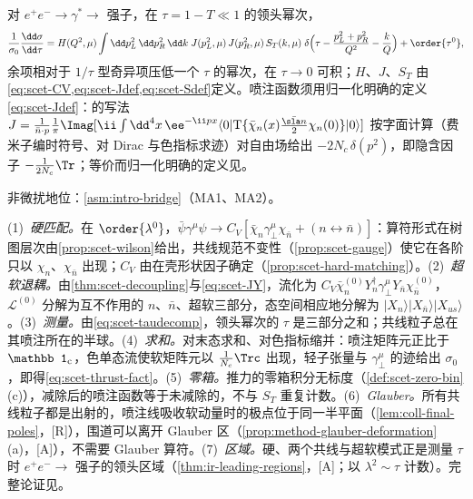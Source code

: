 \begin{theorem}\label{thm:scet-thrust}
对 $e^+e^-\to\gamma^*\to$ 强子，在 $\tau=1-T\ll1$ 的领头幂次，
\begin{equation}\label{eq:scet-thrust-fact}
\frac{1}{\sigma_0}\frac{\dd\sigma}{\dd\tau}=H(Q^2,\mu)\int\dd p_L^2\,\dd p_R^2\,\dd k\;J(p_L^2,\mu)\,J(p_R^2,\mu)\,S_T(k,\mu)\;
\delta\Big(\tau-\frac{p_L^2+p_R^2}{Q^2}-\frac kQ\Big)+\order{\tau^0},
\end{equation}
余项相对于 $1/\tau$ 型奇异项压低一个 $\tau$ 的幂次，在 $\tau\to0$ 可积；$H$、$J$、$S_T$ 由\cref{eq:scet-CV,eq:scet-Jdef,eq:scet-Sdef}定义。喷注函数须用归一化明确的定义\cref{eq:scet-Jdef}：\cite[式~(2.6)]{BecherSchwartz2008}的写法 $J=\frac{1}{\bar n\cdot p}\frac1\pi\Imag[\ii\int\dd^4x\,\ee^{-\ii px}\langle0|\mathrm T\{\bar\chi_n(x)\frac{\bar{\sla n}}2\chi_n(0)\}|0\rangle]$ 按字面计算（费米子编时符号、对 Dirac 与色指标求迹）对自由场给出 $-2N_c\,\delta(p^2)$，即隐含因子 $-\frac1{2N_c}\Tr$；等价而归一化明确的定义见\cite[式~(3)、(6)]{Becher:2006qw}。%
\par 非微扰地位：\cref{asm:intro-bridge}（MA1、MA2）。
\end{theorem}

\begin{proofsketch}
(1)~\emph{硬匹配。}在 $\order{\lambda^0}$，$\bar\psi\gamma^\mu\psi\to C_V[\bar\chi_n\gamma_\perp^\mu\chi_{\bar n}+(n\leftrightarrow\bar n)]$：算符形式在树图层次由\cref{prop:scet-wilson}给出，共线规范不变性（\cref{prop:scet-gauge}）使它在各阶只以 $\chi_n$、$\chi_{\bar n}$ 出现；$C_V$ 由在壳形状因子确定（\cref{prop:scet-hard-matching}）。(2)~\emph{超软退耦。}由\cref{thm:scet-decoupling}与\cref{eq:scet-JY}，流化为 $C_V\bar\chi^{(0)}_nY_n^\dagger\gamma_\perp^\mu Y_{\bar n}\chi^{(0)}_{\bar n}$，$\mathcal L^{(0)}$ 分解为互不作用的 $n$、$\bar n$、超软三部分，态空间相应地分解为 $|X_n\rangle|X_{\bar n}\rangle|X_{us}\rangle$。(3)~\emph{测量。}由\cref{eq:scet-taudecomp}，领头幂次的 $\tau$ 是三部分之和；共线粒子总在其喷注所在的半球。(4)~\emph{求和。}对末态求和、对色指标缩并：喷注矩阵元正比于 $\mathbb 1_{\rm c}$，色单态流使软矩阵元以 $\frac1{N_c}\Trc$ 出现，轻子张量与 $\gamma_\perp^\mu$ 的迹给出 $\sigma_0$，即得\cref{eq:scet-thrust-fact}。(5)~\emph{零箱。}推力的零箱积分无标度（\cref{def:scet-zero-bin}(c)），减除后的喷注函数等于未减除的，不与 $S_T$ 重复计数。(6)~\emph{Glauber。}所有共线粒子都是出射的，喷注线吸收软动量时的极点位于同一半平面（\cref{lem:coll-final-poles}，[R]），围道可以离开 Glauber 区（\cref{prop:method-glauber-deformation}(a)，[A]），不需要 Glauber 算符。(7)~\emph{区域。}硬、两个共线与超软模式正是测量 $\tau$ 时 $e^+e^-\to$ 强子的领头区域（\cref{thm:ir-leading-regions}，[A]；以 $\lambda^2\sim\tau$ 计数）。完整论证见\cite{Bauer:2003di,Fleming:2007qr,Schwartz:2007ib,Fleming:2007xt,BecherSchwartz2008,Bauer:2008dt}。
\end{proofsketch}

